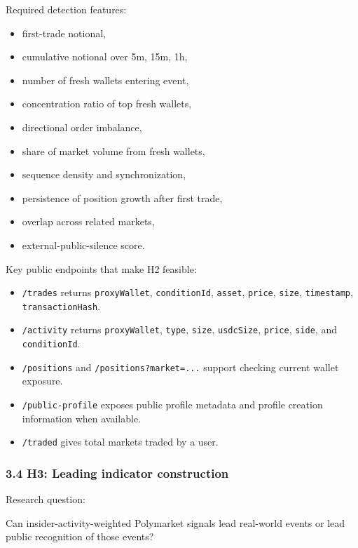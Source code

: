 \documentclass[
]{article}
\providecommand{\tightlist}{%
  \setlength{\itemsep}{0pt}\setlength{\parskip}{0pt}}
\begin{document}
Required detection features:

\begin{itemize}
\tightlist
\item
  first-trade notional,
\item
  cumulative notional over 5m, 15m, 1h,
\item
  number of fresh wallets entering event,
\item
  concentration ratio of top fresh wallets,
\item
  directional order imbalance,
\item
  share of market volume from fresh wallets,
\item
  sequence density and synchronization,
\item
  persistence of position growth after first trade,
\item
  overlap across related markets,
\item
  external-public-silence score.
\end{itemize}

Key public endpoints that make H2 feasible:

\begin{itemize}
\tightlist
\item
  \texttt{/trades} returns \texttt{proxyWallet}, \texttt{conditionId},
  \texttt{asset}, \texttt{price}, \texttt{size}, \texttt{timestamp},
  \texttt{transactionHash}.
\item
  \texttt{/activity} returns \texttt{proxyWallet}, \texttt{type},
  \texttt{size}, \texttt{usdcSize}, \texttt{price}, \texttt{side}, and
  \texttt{conditionId}.
\item
  \texttt{/positions} and \texttt{/positions?market=...} support
  checking current wallet exposure.
\item
  \texttt{/public-profile} exposes public profile metadata and profile
  creation information when available.
\item
  \texttt{/traded} gives total markets traded by a user.
\end{itemize}

\subsubsection{3.4 H3: Leading indicator
construction}\label{34-h3-leading-indicator-construction}

Research question:

Can insider-activity-weighted Polymarket signals lead real-world events
or lead public recognition of those events?
\end{document}
